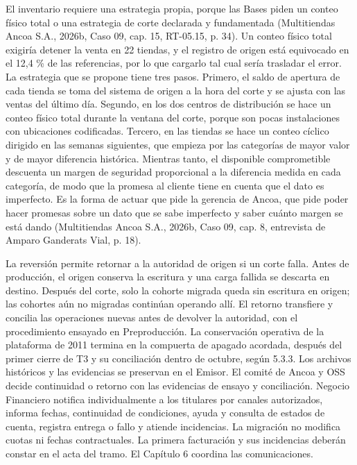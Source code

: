 \documentclass[11pt]{article}
\begin{document}
El inventario requiere una estrategia propia, porque las Bases piden un conteo físico total o una estrategia de corte declarada y fundamentada (Multitiendas Ancoa S.A., 2026b, Caso 09, cap. 15, RT-05.15, p. 34). Un conteo físico total exigiría detener la venta en 22 tiendas, y el registro de origen está equivocado en el 12,4 \% de las referencias, por lo que cargarlo tal cual sería trasladar el error. La estrategia que se propone tiene tres pasos. Primero, el saldo de apertura de cada tienda se toma del sistema de origen a la hora del corte y se ajusta con las ventas del último día. Segundo, en los dos centros de distribución se hace un conteo físico total durante la ventana del corte, porque son pocas instalaciones con ubicaciones codificadas. Tercero, en las tiendas se hace un conteo cíclico dirigido en las semanas siguientes, que empieza por las categorías de mayor valor y de mayor diferencia histórica. Mientras tanto, el disponible comprometible descuenta un margen de seguridad proporcional a la diferencia medida en cada categoría, de modo que la promesa al cliente tiene en cuenta que el dato es imperfecto. Es la forma de actuar que pide la gerencia de Ancoa, que pide poder hacer promesas sobre un dato que se sabe imperfecto y saber cuánto margen se está dando (Multitiendas Ancoa S.A., 2026b, Caso 09, cap. 8, entrevista de Amparo Ganderats Vial, p. 18).

La reversión permite retornar a la autoridad de origen si un corte falla. Antes de producción, el origen conserva la escritura y una carga fallida se descarta en destino. Después del corte, solo la cohorte migrada queda sin escritura en origen; las cohortes aún no migradas continúan operando allí. El retorno transfiere y concilia las operaciones nuevas antes de devolver la autoridad, con el procedimiento ensayado en Preproducción. La conservación operativa de la plataforma de 2011 termina en la compuerta de apagado acordada, después del primer cierre de T3 y su conciliación dentro de octubre, según 5.3.3. Los archivos históricos y las evidencias se preservan en el Emisor. El comité de Ancoa y OSS decide continuidad o retorno con las evidencias de ensayo y conciliación. Negocio Financiero notifica individualmente a los titulares por canales autorizados, informa fechas, continuidad de condiciones, ayuda y consulta de estados de cuenta, registra entrega o fallo y atiende incidencias. La migración no modifica cuotas ni fechas contractuales. La primera facturación y sus incidencias deberán constar en el acta del tramo. El Capítulo 6 coordina las comunicaciones.
\end{document}
